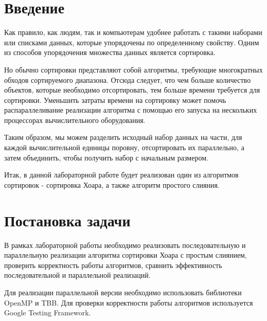\documentclass{report}
\begin{document}
\setcounter{page}{2}

\tableofcontents
\newpage

\section*{Введение}
Как правило, как людям, так и компьютерам удобнее работать с такими наборами или списками данных, которые упорядочены по определенному свойству. Одним из способов упорядочения множества данных является сортировка.
\par Но обычно сортировки представляют собой алгоритмы, требующие многократных обходов сортируемого диапазона. Отсюда следует, что чем больше количество объектов, которые необходимо отсортировать, тем больше времени требуется для сортировки. Уменьшить затраты времени на сортировку может помочь распараллеливание реализации алгоритма с помощью его запуска на нескольких процессорах вычислительного оборудования.
\par Таким образом, мы можем разделить исходный набор данных на части, для каждой вычислительной единицы поровну, отсортировать их параллельно, а затем объединить, чтобы получить набор с начальным размером.
\par Итак, в данной лабораторной работе будет реализован один из алгоритмов сортировок - сортировка Хоара, а также алгоритм простого слияния.

\newpage

\section*{Постановка задачи}
В рамках лабораторной работы необходимо реализовать последовательную и параллельную реализации алгоритма сортировки Хоара с простым слиянием, проверить корректность работы алгоритмов, сравнить эффективность последовательной и параллельной реализаций.
\par Для реализации параллельной версии необходимо использовать библиотеки OpenMP и TBB. Для проверки корректности работы алгоритмов используется Google Testing Framework.
\newpage

\end{document}
